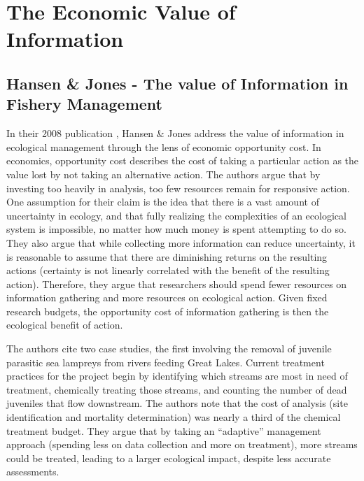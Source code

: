 \section{The Economic Value of Information}
\subsection{Hansen \& Jones - The value of Information in Fishery Management}
In their 2008 publication \cite{Hansen2008}, Hansen \& Jones address the value of information in ecological management through the lens of economic opportunity cost.  In economics, opportunity cost describes the cost of taking a particular action as the value lost by not taking an alternative action.  The authors argue that by investing too heavily in analysis, too few resources remain for responsive action.  One assumption for their claim is the idea that there is a vast amount of uncertainty in ecology, and that fully realizing the complexities of an ecological system is impossible, no matter how much money is spent attempting to do so.  They also argue that while collecting more information can reduce uncertainty, it is reasonable to assume that there are diminishing returns on the resulting actions (certainty is not linearly correlated with the benefit of the resulting action).  Therefore, they argue that researchers should spend fewer resources on information gathering and more resources on ecological action.  Given fixed research budgets, the opportunity cost of information gathering is then the ecological benefit of action.  

The authors cite two case studies, the first involving the removal of juvenile parasitic sea lampreys from rivers feeding Great Lakes.  Current treatment practices for the project begin by identifying which streams are most in need of treatment, chemically treating those streams, and counting the number of dead juveniles that flow downstream.  The authors note that the cost of analysis (site identification and mortality determination) was nearly a third of the chemical treatment budget.  They argue that by taking an ``adaptive'' management approach (spending less on data collection and more on treatment), more streams could be treated, leading to a larger ecological impact, despite less accurate assessments.

